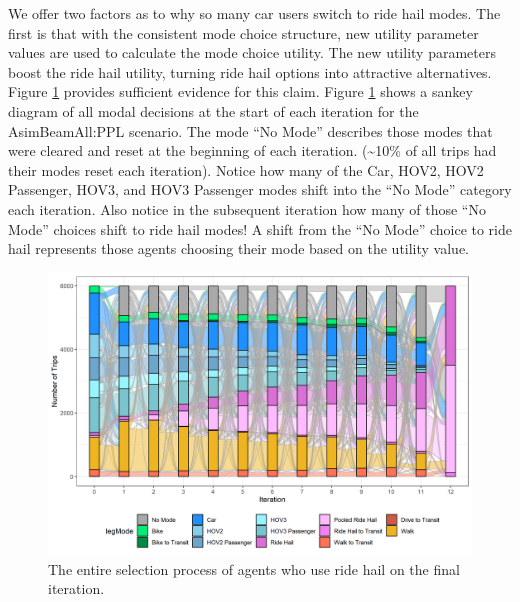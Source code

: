 \documentclass[12pt, oneside, openright]{byuthesis}
\begin{document}
We offer two factors as to why so many car users switch to ride hail modes. The first is that with the consistent mode choice structure, new utility parameter values are used to calculate the mode choice utility. The new utility parameters boost the ride hail utility, turning ride hail options into attractive alternatives. Figure \ref{fig:sankey} provides sufficient evidence for this claim. Figure \ref{fig:sankey} shows a sankey diagram of all modal decisions at the start of each iteration for the AsimBeamAll:PPL scenario. The mode ``No Mode'' describes those modes that were cleared and reset at the beginning of each iteration. (\textasciitilde10\% of all trips had their modes reset each iteration). Notice how many of the Car, HOV2, HOV2 Passenger, HOV3, and HOV3 Passenger modes shift into the ``No Mode'' category each iteration. Also notice in the subsequent iteration how many of those ``No Mode'' choices shift to ride hail modes! A shift from the ``No Mode'' choice to ride hail represents those agents choosing their mode based on the utility value.

\begin{landscape}

\begin{figure}[H]
\centering
\includegraphics{planshifts.png}
\caption{The entire selection process of agents who use ride hail on the final iteration.}
\label{fig:sankey}
\end{figure}

\end{landscape}
\end{document}
